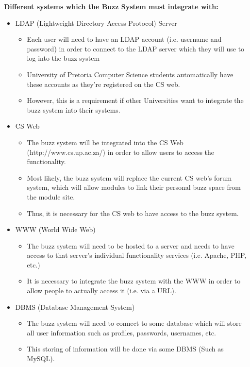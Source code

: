 \documentclass[11pt]{article}
\begin{document}
	\textbf{Different systems which the Buzz System must integrate with:}
	\\
	\begin{itemize}
	\item LDAP (Lightweight Directory Access Protocol) Server
		\begin{itemize}
			\item Each user will need to have an LDAP account (i.e. username and password) in order to connect to the LDAP server which they will use to log into the buzz system
			\item University of Pretoria Computer Science students automatically have these accounts as they’re registered on the CS web.
			\item However, this is a requirement if other Universities want to integrate the buzz system into their systems.
		\end{itemize}
	
	\item CS Web
		\begin{itemize}
			\item The buzz system will be integrated into the CS Web (http://www.cs.up.ac.za/) in order to allow users to access the functionality. 
			\item Most likely, the buzz system will replace the current CS web’s forum system, which will allow modules to link their personal buzz space from the module site.
			\item Thus, it is necessary for the CS web to have access to the buzz system.
		\end{itemize}
	\item WWW (World Wide Web)
		\begin{itemize}
			\item The buzz system will need to be hosted to a server and needs to have access to that server’s individual functionality services (i.e. Apache, PHP, etc.)
			\item It is necessary to integrate the buzz system with the WWW in order to allow people to actually access it (i.e. via a URL).
		\end{itemize}
	\item DBMS (Database Management System)
		\begin{itemize}
			\item The buzz system will need to connect to some database which will store all user information such as profiles, passwords, usernames, etc. 
			\item This storing of information will be done via some DBMS (Such as MySQL).
		\end{itemize}
	\end{itemize}
	
\end{document}
